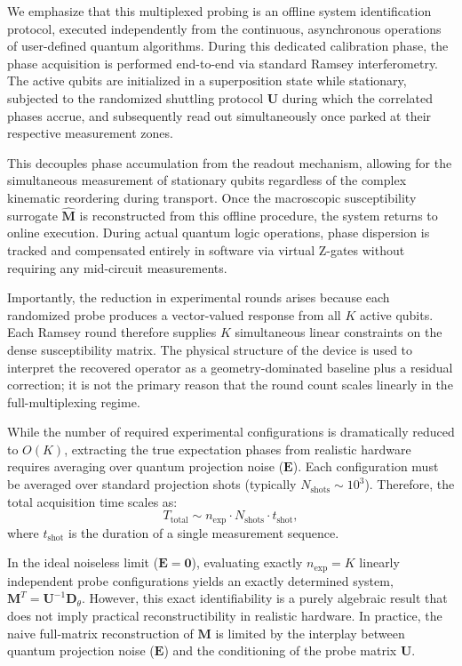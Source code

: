 \documentclass[a4paper,twocolumn,11pt]{quantumarticle}
\begin{document}
We emphasize that this multiplexed probing is an offline system identification protocol, executed independently from the continuous, asynchronous operations of user-defined quantum algorithms. During this dedicated calibration phase, the phase acquisition is performed end-to-end via standard Ramsey interferometry. The active qubits are initialized in a superposition state while stationary, subjected to the randomized shuttling protocol $\mathbf{U}$ during which the correlated phases accrue, and subsequently read out simultaneously once parked at their respective measurement zones. 

This decouples phase accumulation from the readout mechanism, allowing for the simultaneous measurement of stationary qubits regardless of the complex kinematic reordering during transport. Once the macroscopic susceptibility surrogate $\hat{\mathbf{M}}$ is reconstructed from this offline procedure, the system returns to online execution. During actual quantum logic operations, phase dispersion is tracked and compensated entirely in software via virtual Z-gates without requiring any mid-circuit measurements.

Importantly, the reduction in experimental rounds arises because each randomized probe produces a vector-valued response from all $K$ active qubits. Each Ramsey round therefore supplies $K$ simultaneous linear constraints on the dense susceptibility matrix. The physical structure of the device is used to interpret the recovered operator as a geometry-dominated baseline plus a residual correction; it is not the primary reason that the round count scales linearly in the full-multiplexing regime.

While the number of required experimental configurations is dramatically reduced to $O(K)$, extracting the true expectation phases from realistic hardware requires averaging over quantum projection noise ($\mathbf{E}$). Each configuration must be averaged over standard projection shots (typically $N_{\text{shots}} \sim 10^3$). Therefore, the total acquisition time scales as:
\begin{equation}
    T_{\text{total}} \sim n_{\text{exp}} \cdot N_{\text{shots}} \cdot t_{\text{shot}},
\end{equation}
where $t_{\text{shot}}$ is the duration of a single measurement sequence. 

In the ideal noiseless limit ($\mathbf{E}=\mathbf{0}$), evaluating exactly $n_{\text{exp}} = K$ linearly independent probe configurations yields an exactly determined system, $\mathbf{M}^{T} = \mathbf{U}^{-1}\mathbf{D}_{\theta}$. However, this exact identifiability is a purely algebraic result that does not imply practical reconstructibility in realistic hardware. In practice, the naive full-matrix reconstruction of $\mathbf{M}$ is limited by the interplay between quantum projection noise ($\mathbf{E}$) and the conditioning of the probe matrix $\mathbf{U}$.
\end{document}
